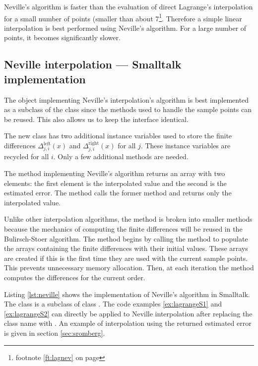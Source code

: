 Neville's algorithm is faster than the evaluation of direct
Lagrange's interpolation for a small number of points (smaller
than about 7\footnote{\cf footnote \ref{ft:lagnev} on page
\pageref{ft:lagnev}}. Therefore a simple linear interpolation is
best performed using Neville's algorithm. For a large number of
points, it becomes significantly slower.

\subsection{ Neville interpolation --- Smalltalk  implementation}
The object implementing Neville's interpolation's algorithm is best implemented as a subclass of the
class  since the methods used to handle
the sample points can be reused. This also allows us to keep the
interface identical.

The new class has two additional instance variables used to store
the finite differences $\Delta_{j,i}^{\mathop{
left}}\left(x\right)$ and $\Delta_{j,i}^{\mathop{
right}}\left(x\right)$ for all $j$.
These instance variables are recycled for all $i$.
Only a few additional methods are needed.

The method  implementing Neville's algorithm
returns an array with two elements: the first element is the
interpolated value and the second is the estimated error. The
method  calls the former method and returns only the
interpolated value.

Unlike other interpolation algorithms, the method  is broken into smaller methods because the
mechanics of computing the finite differences will be reused in
the Bulirsch-Stoer algorithm. The method 
begins by calling the method  to
populate the arrays containing the finite differences with their
initial values. These arrays are created if this is the first time
they are used with the current sample points. This prevents
unnecessary memory allocation. Then, at each iteration the method  computes the differences for the current order.

Listing \ref{lst:neville} shows the implementation of Neville's
algorithm in Smalltalk. The class  is
a subclass of class . The code
examples \ref{ex:lagrangeS1} and \ref{ex:lagrangeS2} can directly
be applied to Neville interpolation after replacing the class name
 with .
An example of interpolation using the returned estimated error is
given in section \ref{sec:sromberg}.

